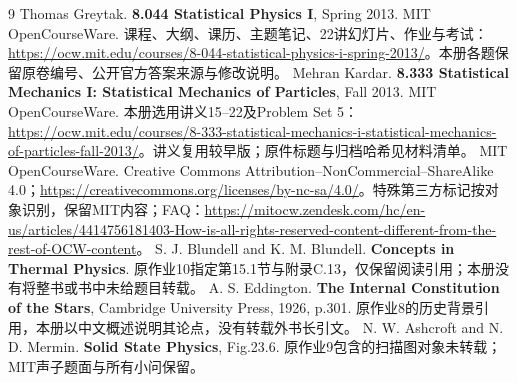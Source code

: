 \begin{thebibliography}{9}
 Thomas Greytak. \textbf{8.044 Statistical Physics I}, Spring 2013. MIT OpenCourseWare. 课程、大纲、课历、主题笔记、22讲幻灯片、作业与考试：\url{https://ocw.mit.edu/courses/8-044-statistical-physics-i-spring-2013/}。本册各题保留原卷编号、公开官方答案来源与修改说明。
 Mehran Kardar. \textbf{8.333 Statistical Mechanics I: Statistical Mechanics of Particles}, Fall 2013. MIT OpenCourseWare. 本册选用讲义15--22及Problem Set 5：\url{https://ocw.mit.edu/courses/8-333-statistical-mechanics-i-statistical-mechanics-of-particles-fall-2013/}。讲义复用较早版；原件标题与归档哈希见材料清单。
 MIT OpenCourseWare. Creative Commons Attribution--NonCommercial--ShareAlike 4.0；\url{https://creativecommons.org/licenses/by-nc-sa/4.0/}。特殊第三方标记按对象识别，保留MIT内容；FAQ：\url{https://mitocw.zendesk.com/hc/en-us/articles/4414756181403-How-is-all-rights-reserved-content-different-from-the-rest-of-OCW-content}。
 S. J. Blundell and K. M. Blundell. \textbf{Concepts in Thermal Physics}. 原作业10指定第15.1节与附录C.13，仅保留阅读引用；本册没有将整书或书中未给题目转载。
 A. S. Eddington. \textbf{The Internal Constitution of the Stars}, Cambridge University Press, 1926, p.301. 原作业8的历史背景引用，本册以中文概述说明其论点，没有转载外书长引文。
 N. W. Ashcroft and N. D. Mermin. \textbf{Solid State Physics}, Fig.23.6. 原作业9包含的扫描图对象未转载；MIT声子题面与所有小问保留。
\end{thebibliography}
